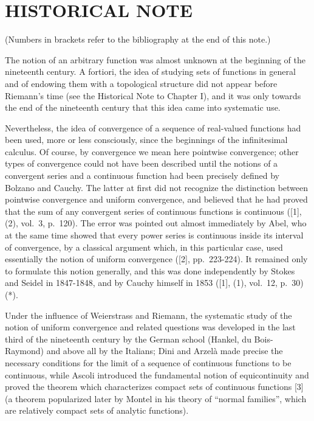 \section*{HISTORICAL NOTE}
{}

(Numbers in brackets refer to the bibliography at the end of this note.)

The notion of an arbitrary function was almost unknown at the beginning of the nineteenth century. A fortiori, the idea of studying sets of functions in general and of endowing them with a topological structure did not appear before Riemann's time (see the Historical Note to Chapter I), and it was only towards the end of the nineteenth century that this idea came into systematic use.

Nevertheless, the idea of convergence of a sequence of real-valued functions had been used, more or less consciously, since the beginnings of the infinitesimal calculus. Of course, by convergence we mean here pointwise convergence; other types of convergence could not have been described until the notions of a convergent series and a continuous function had been precisely defined by Bolzano and Cauchy. The latter at first did not recognize the distinction between pointwise convergence and uniform convergence, and believed that he had proved that the sum of any convergent series of continuous functions is continuous ({[}1{]}, (2), vol.~3, p.~120). The error was pointed out almost immediately by Abel, who at the same time showed that every power series is continuous inside its interval of convergence, by a classical argument which, in this particular case, used essentially the notion of uniform convergence ({[}2{]}, pp.~223-224). It remained only to formulate this notion generally, and this was done independently by Stokes and Seidel in 1847-1848, and by Cauchy himself in 1853 ({[}1{]}, (1), vol.~12, p.~30) (*).

Under the influence of Weierstrass and Riemann, the systematic study of the notion of uniform convergence and related questions was developed in the last third of the nineteenth century by the German school (Hankel, du Bois-Raymond) and above all by the Italians; Dini and Arzelà made precise the necessary conditions for the limit of a sequence of continuous functions to be continuous, while Ascoli introduced the fundamental notion of equicontinuity and proved the theorem which characterizes compact sets of continuous functions {[}3{]} (a theorem popularized later by Montel in his theory of ``normal families'', which are relatively compact sets of analytic functions).

